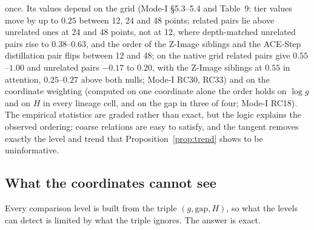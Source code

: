\documentclass[11pt]{article}
\theoremstyle{definition}
\newcommand{\gap}{\mathrm{gap}}
\begin{document}
once. Its values depend on the grid (Mode-I \S5.3--5.4 and Table~9: tier values move by up to $0.25$ between 12, 24 and 48 points; related pairs lie above unrelated ones at 24 and 48 points, not at 12, where depth-matched unrelated pairs rise to $0.38$--$0.63$, and the order of the Z-Image siblings and the ACE-Step distillation pair flips between 12 and 48; on the native grid related pairs give $0.55$--$1.00$ and unrelated pairs $-0.17$ to $0.20$, with the Z-Image siblings at $0.55$ in attention, $0.25$--$0.27$ above both nulls; Mode-I RC30, RC33) and on the coordinate weighting (computed on one coordinate alone the order holds on $\log g$ and on $H$ in every lineage cell, and on the gap in three of four; Mode-I RC18). The empirical statistics are graded rather than exact, but the logic explains the observed ordering: coarse relations are easy to satisfy, and the tangent removes exactly the level and trend that Proposition~\ref{prop:trend} shows to be uninformative.

\subsection{What the coordinates cannot see}\label{sec:invariance}
Every comparison level is built from the triple $(g,\gap,H)$, so what the levels can detect is limited by what the triple ignores. The answer is exact.
\end{document}
